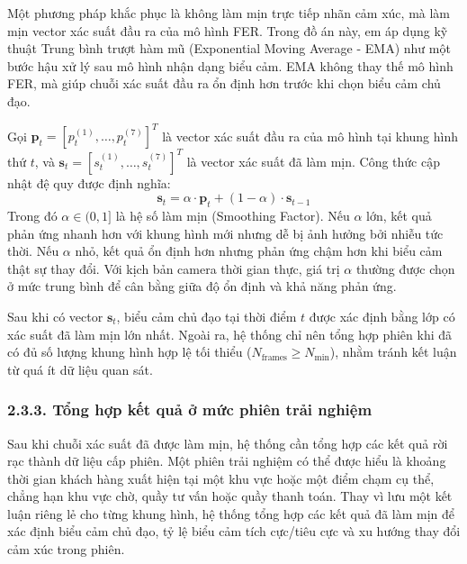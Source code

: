 Một phương pháp khắc phục là không làm mịn trực tiếp nhãn cảm xúc, mà làm mịn vector xác suất đầu ra của mô hình FER. Trong đồ án này, em áp dụng kỹ thuật Trung bình trượt hàm mũ (Exponential Moving Average - EMA) như một bước hậu xử lý sau mô hình nhận dạng biểu cảm. EMA không thay thế mô hình FER, mà giúp chuỗi xác suất đầu ra ổn định hơn trước khi chọn biểu cảm chủ đạo.

Gọi $\bm{p}_t = [p_t^{(1)}, \dots, p_t^{(7)}]^T$ là vector xác suất đầu ra của mô hình tại khung hình thứ $t$, và $\bm{s}_t = [s_t^{(1)}, \dots, s_t^{(7)}]^T$ là vector xác suất đã làm mịn. Công thức cập nhật đệ quy được định nghĩa:
\begin{equation}
\bm{s}_t = \alpha \cdot \bm{p}_t + (1 - \alpha) \cdot \bm{s}_{t-1}
\end{equation}
Trong đó $\alpha \in (0, 1]$ là hệ số làm mịn (Smoothing Factor). Nếu $\alpha$ lớn, kết quả phản ứng nhanh hơn với khung hình mới nhưng dễ bị ảnh hưởng bởi nhiễu tức thời. Nếu $\alpha$ nhỏ, kết quả ổn định hơn nhưng phản ứng chậm hơn khi biểu cảm thật sự thay đổi. Với kịch bản camera thời gian thực, giá trị $\alpha$ thường được chọn ở mức trung bình để cân bằng giữa độ ổn định và khả năng phản ứng.

Sau khi có vector $\bm{s}_t$, biểu cảm chủ đạo tại thời điểm $t$ được xác định bằng lớp có xác suất đã làm mịn lớn nhất. Ngoài ra, hệ thống chỉ nên tổng hợp phiên khi đã có đủ số lượng khung hình hợp lệ tối thiểu ($N_{\text{frames}} \ge N_{\text{min}}$), nhằm tránh kết luận từ quá ít dữ liệu quan sát.

\subsubsection*{2.3.3. Tổng hợp kết quả ở mức phiên trải nghiệm}

Sau khi chuỗi xác suất đã được làm mịn, hệ thống cần tổng hợp các kết quả rời rạc thành dữ liệu cấp phiên. Một phiên trải nghiệm có thể được hiểu là khoảng thời gian khách hàng xuất hiện tại một khu vực hoặc một điểm chạm cụ thể, chẳng hạn khu vực chờ, quầy tư vấn hoặc quầy thanh toán. Thay vì lưu một kết luận riêng lẻ cho từng khung hình, hệ thống tổng hợp các kết quả đã làm mịn để xác định biểu cảm chủ đạo, tỷ lệ biểu cảm tích cực/tiêu cực và xu hướng thay đổi cảm xúc trong phiên.


